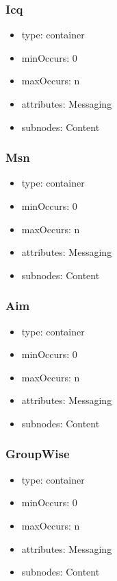 \documentclass[a4paper,11pt]{article}
\begin{document}
\subsubsection{Icq}
\begin{itemize}
  \item type: container
  \item minOccurs: 0
  \item maxOccurs: n
  \item attributes: Messaging
  \item subnodes:
  \subitem Content
\end{itemize}

\subsubsection{Msn}
\begin{itemize}
  \item type: container
  \item minOccurs: 0
  \item maxOccurs: n
  \item attributes: Messaging
  \item subnodes:
  \subitem Content
\end{itemize}

\subsubsection{Aim}
\begin{itemize}
  \item type: container
  \item minOccurs: 0
  \item maxOccurs: n
  \item attributes: Messaging
  \item subnodes:
  \subitem Content
\end{itemize}

\subsubsection{GroupWise}
\begin{itemize}
  \item type: container
  \item minOccurs: 0
  \item maxOccurs: n
  \item attributes: Messaging
  \item subnodes:
  \subitem Content
\end{itemize}
\end{document}
